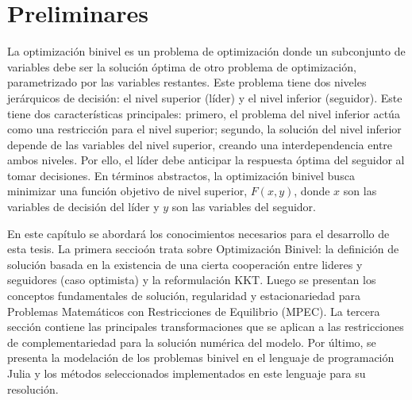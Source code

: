 \chapter{Preliminares}\label{chapter:state-of-the-art}

La optimización binivel es un problema de optimización donde un subconjunto de variables debe ser la solución óptima de otro problema de optimización, parametrizado por las variables restantes. Este problema tiene dos niveles jerárquicos de decisión: el nivel superior (líder) y el nivel inferior (seguidor).
Este tiene dos características principales: primero, el problema del nivel inferior actúa como una restricción para el nivel superior; segundo, la solución del nivel inferior depende de las variables del nivel superior, creando una interdependencia entre ambos niveles. Por ello, el líder debe anticipar la respuesta óptima del seguidor al tomar decisiones.
En términos abstractos, la optimización binivel busca minimizar una función objetivo de nivel superior, $F(x, y)$, donde $x$ son las variables de decisión del líder y $y$ son las variables del seguidor. 

En este capítulo se abordará los conocimientos necesarios para el desarrollo de esta tesis. La primera seccio\'on trata  sobre Optimización Binivel: la definición de solución basada en la existencia de una cierta cooperación entre lideres y seguidores (caso  optimista) y la reformulación KKT. Luego se presentan los conceptos fundamentales  de solución, regularidad y estacionariedad para   Problemas Matemáticos con Restricciones de Equilibrio (MPEC). La tercera sección contiene las principales transformaciones que se aplican a las restricciones de complementariedad para la solución num\'erica del modelo. Por último, se presenta la modelación de los problemas binivel en el lenguaje de programación Julia y los métodos seleccionados implementados en este lenguaje para su resolución. 

